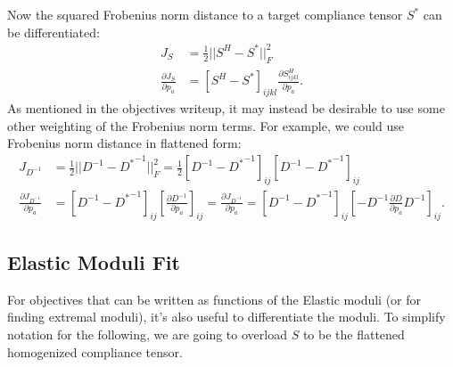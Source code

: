 \documentclass[10pt]{article}
\providecommand{\pder}[2]{\frac{\partial #1}{\partial #2}}
\begin{document}
Now the squared Frobenius norm distance to a target compliance tensor $S^*$ can
be differentiated:
\begin{align*}
    J_S &= \frac{1}{2} ||S^H - S^*||^2_F \\
    \pder{J_S}{p_a} &= \left[S^H - S^*\right]_{ijkl} \pder{S^H_{ijkl}}{p_a}.
\end{align*}
As mentioned in the objectives writeup, it may instead be desirable to use some
other weighting of the Frobenius norm terms. For example, we could use Frobenius
norm distance in flattened form:
\begin{align*}
    J_{D^{-1}} &= \frac{1}{2} ||D^{-1} - {D^*}^{-1}||^2_F =
        \frac{1}{2} \left[D^{-1} - {D^*}^{-1}\right]_{ij}
                    \left[D^{-1} - {D^*}^{-1}\right]_{ij} \\
                    \pder{J_{D^{-1}}}{p_a} &= [D^{-1} - {D^*}^{-1}]_{ij}
                    \left[\pder{D^{-1}}{p_a}\right]_{ij} = 
        \pder{J_{D^{-1}}}{p_a} = [D^{-1} - {D^*}^{-1}]_{ij}
                    \left[-D^{-1} \pder{D}{p_a} D^{-1}\right]_{ij}.
\end{align*}

\subsection{Elastic Moduli Fit}
For objectives that can be written as functions of the Elastic moduli (or for
finding extremal moduli), it's also useful to differentiate the moduli.
To simplify notation for the following, we are going to overload $S$ to be the
flattened homogenized compliance tensor.
\end{document}
